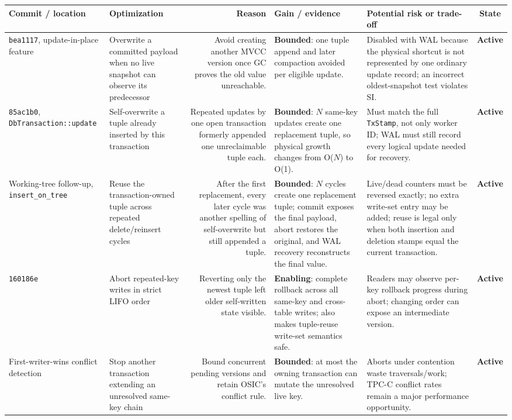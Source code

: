 \documentclass[10pt,a4paper,landscape]{article}
\newcommand{\code}[1]{\texttt{#1}}
\newcommand{\commit}[1]{\code{#1}}
\newcommand{\gainbounded}{\textbf{Bounded}}
\newcommand{\gainenabling}{\textbf{Enabling}}
\newcommand{\stateactive}{\textbf{Active}}
\begin{document}
\begin{longtable}{IORGKS}
\toprule
\textbf{Commit / location} & \textbf{Optimization} & \textbf{Reason} &
\textbf{Gain / evidence} & \textbf{Potential risk or trade-off} & \textbf{State} \\
\midrule
\endhead
\commit{bea1117}, update-in-place feature & Overwrite a committed payload when no live
snapshot can observe its predecessor & Avoid creating another MVCC version once GC proves
the old value unreachable. & \gainbounded: one tuple append and later compaction avoided per
eligible update. & Disabled with WAL because the physical shortcut is not represented by
one ordinary update record; an incorrect oldest-snapshot test violates SI. & \stateactive \\

\commit{85ac1b0}, \code{DbTransaction::update} & Self-overwrite a tuple already inserted
by this transaction & Repeated updates by one open transaction formerly appended one
unreclaimable tuple each. & \gainbounded: $N$ same-key updates create one replacement tuple,
so physical growth changes from O($N$) to O(1). & Must match the full \code{TxStamp}, not
only worker ID; WAL must still record every logical update needed for recovery. & \stateactive \\

Working-tree follow-up, \code{insert\_on\_tree} & Reuse the transaction-owned tuple across
repeated delete/reinsert cycles & After the first replacement, every later cycle was
another spelling of self-overwrite but still appended a tuple. & \gainbounded: $N$ cycles
create one replacement tuple; commit exposes the final payload, abort restores the
original, and WAL recovery reconstructs the final value. & Live/dead counters must be
reversed exactly; no extra write-set entry may be added; reuse is legal only when both
insertion and deletion stamps equal the current transaction. & \stateactive \\

\commit{160186e} & Abort repeated-key writes in strict LIFO order & Reverting only the
newest tuple left older self-written state visible. & \gainenabling: complete rollback across
all same-key and cross-table writes; also makes tuple-reuse write-set semantics safe. &
Readers may observe per-key rollback progress during abort; changing order can expose an
intermediate version. & \stateactive \\

First-writer-wins conflict detection & Stop another transaction extending an unresolved
same-key chain & Bound concurrent pending versions and retain OSIC's conflict rule. &
\gainbounded: at most the owning transaction can mutate the unresolved live key. & Aborts
under contention waste traversals/work; TPC-C conflict rates remain a major performance
opportunity. & \stateactive \\
\bottomrule
\end{longtable}
\end{document}
